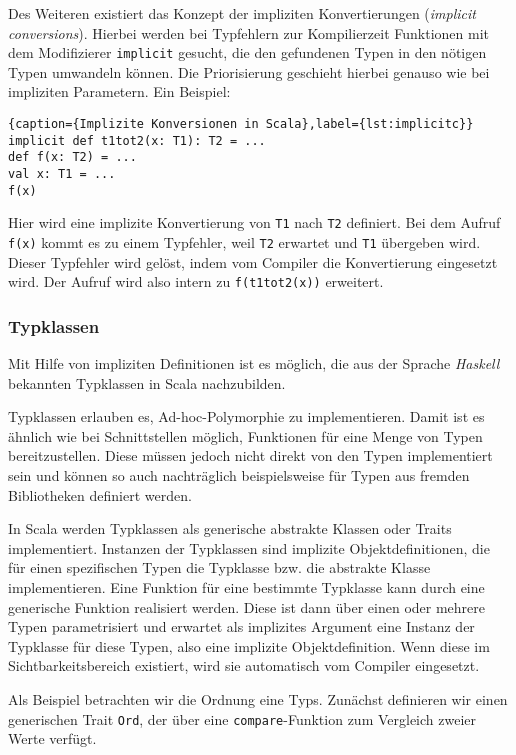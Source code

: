 Des Weiteren existiert das Konzept der impliziten Konvertierungen (\textit{implicit conversions}).
Hierbei werden bei Typfehlern zur Kompilierzeit Funktionen mit dem Modifizierer \texttt{implicit}
gesucht, die den gefundenen Typen in den nötigen Typen umwandeln können.  Die Priorisierung
geschieht hierbei genauso wie bei impliziten Parametern. Ein Beispiel:

\begin{lstlisting}{caption={Implizite Konversionen in Scala},label={lst:implicitc}}
implicit def t1tot2(x: T1): T2 = ...
def f(x: T2) = ...
val x: T1 = ...
f(x)
\end{lstlisting}

Hier wird eine implizite Konvertierung von \texttt{T1} nach \texttt{T2}  definiert. Bei dem Aufruf
\texttt{f(x)} kommt es zu einem Typfehler, weil  \texttt{T2} erwartet und \texttt{T1} übergeben
wird. Dieser Typfehler wird  gelöst, indem vom Compiler die Konvertierung eingesetzt wird. Der Aufruf
wird also intern zu \texttt{f(t1tot2(x))} erweitert.

\subsubsection{Typklassen}

Mit Hilfe von impliziten Definitionen ist es möglich, die aus der Sprache \textit{Haskell} bekannten
Typklassen in Scala nachzubilden.

Typklassen erlauben es, Ad-hoc-Polymorphie zu implementieren. Damit ist es ähnlich wie bei
Schnittstellen möglich, Funktionen für eine Menge von Typen bereitzustellen. Diese müssen jedoch
nicht direkt von den Typen implementiert sein und können so auch nachträglich beispielsweise für
Typen aus fremden Bibliotheken definiert werden.

In Scala werden Typklassen als generische abstrakte Klassen oder Traits implementiert. Instanzen der
Typklassen sind implizite Objektdefinitionen, die für einen spezifischen Typen die Typklasse bzw.
die abstrakte Klasse implementieren. Eine Funktion für eine bestimmte Typklasse kann durch eine
generische Funktion  realisiert werden. Diese ist dann über einen oder mehrere Typen parametrisiert
und erwartet als implizites Argument eine Instanz der Typklasse für diese Typen,  also eine
implizite Objektdefinition. Wenn diese im Sichtbarkeitsbereich existiert, wird sie automatisch vom
Compiler eingesetzt.

Als Beispiel betrachten wir die Ordnung eine Typs. Zunächst definieren wir einen generischen Trait
\texttt{Ord}, der über eine \texttt{compare}-Funktion zum Vergleich zweier Werte verfügt.

